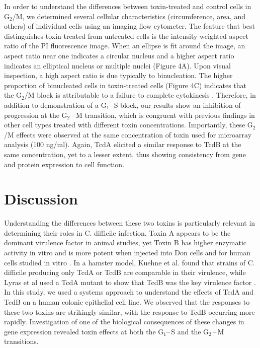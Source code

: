In order to understand the differences between toxin-treated and control cells in G$_{\text{2}}$/M, we determined  several cellular characteristics (circumference, area, and others) of individual cells using an imaging flow cytometer. The feature that best distinguishes toxin-treated from untreated cells is the intensity-weighted aspect ratio of the PI fluorescence image. When an ellipse is fit around the image, an aspect ratio near one indicates a circular nucleus and a higher aspect ratio indicates an elliptical nucleus or multiple nuclei (Figure 4A). Upon visual inspection, a high aspect ratio is due typically to binucleation. The higher proportion of binucleated cells in toxin-treated cells (Figure 4C) indicates that the G$_{\text{2}}$/M block is attributable to a failure to complete cytokinesis \cite{Huelsenbeck:2009di}. Therefore, in addition to demonstration of a G$_{\text{1}}$--\,S block, our results show an inhibition of progression at the G$_{\text{2}}$\,--\,M transition, which is congruent with previous findings \cite{Kim:2005jk, Gerhard:2008wz, Nottrott:2007ep, Fiorentini:1998uh} in other cell types treated with different toxin concentrations. Importantly, these G$_{\text{2}}$/M effects were observed at the same concentration of toxin used for microarray analysis (100 ng/ml). Again, TcdA elicited a similar response to TcdB at the same concentration, yet to a lesser extent, thus showing consistency from gene and protein expression to cell function.

\section{Discussion}
Understanding the differences between these two toxins is particularly relevant in determining their roles in C. difficile infection. Toxin A appears to be the dominant virulence factor in animal studies, yet Toxin B has higher enzymatic activity in vitro and is more potent when injected into Don cells and for human cells studied in vitro \cite{ChavesOlarte:1997cs,Riegler:1995jz}. In a hamster model, Kuehne et al. found that strains of C. difficile producing only TcdA or TcdB are comparable in their virulence, while Lyras et al used a TcdA mutant to show that TcdB was the key virulence factor \cite{Kuehne:2010hv,Lyras:2009jx}. In this study, we used a systems approach to understand the effects of TcdA and TcdB on a human colonic epithelial cell line. We observed that the responses to these two toxins are strikingly similar, with the response to TcdB occurring more rapidly. Investigation of one of the biological consequences of these changes in gene expression revealed toxin effects at both the G$_{\text{1}}$--\,S and the G$_{\text{2}}$\,--\,M transitions.

